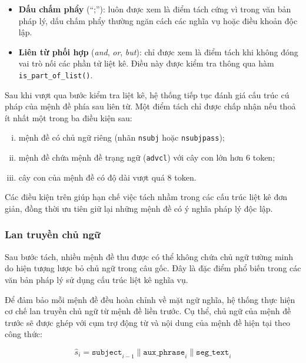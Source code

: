 \begin{itemize}
    \item \textbf{Dấu chấm phẩy} (``;''): luôn được xem là điểm tách cứng
    vì trong văn bản pháp lý, dấu chấm phẩy thường ngăn cách các nghĩa vụ
    hoặc điều khoản độc lập.

    \item \textbf{Liên từ phối hợp} (\textit{and}, \textit{or},
    \textit{but}): chỉ được xem là điểm tách khi không đóng vai trò nối
    các phần tử liệt kê. Điều này được kiểm tra thông qua hàm
    \texttt{is\_part\_of\_list()}.
\end{itemize}

Sau khi vượt qua bước kiểm tra liệt kê, hệ thống tiếp tục đánh giá cấu
trúc cú pháp của mệnh đề phía sau liên từ. Một điểm tách chỉ được chấp
nhận nếu thoả ít nhất một trong ba điều kiện sau:

\begin{enumerate}[(i)]
    \item mệnh đề có chủ ngữ riêng (nhãn \texttt{nsubj} hoặc
          \texttt{nsubjpass});

    \item mệnh đề chứa mệnh đề trạng ngữ (\texttt{advcl}) với
          cây con lớn hơn 6 token;

    \item cây con của mệnh đề có độ dài vượt quá 8 token.
\end{enumerate}

Các điều kiện trên giúp hạn chế việc tách nhầm trong các cấu trúc liệt kê
đơn giản, đồng thời ưu tiên giữ lại những mệnh đề có ý nghĩa pháp lý độc
lập.

\subsubsection{Lan truyền chủ ngữ}

Sau bước tách, nhiều mệnh đề thu được có thể không chứa chủ ngữ tường
minh do hiện tượng lược bỏ chủ ngữ trong câu gốc. Đây là đặc điểm phổ
biến trong các văn bản pháp lý sử dụng cấu trúc liệt kê nghĩa vụ.

Để đảm bảo mỗi mệnh đề đều hoàn chỉnh về mặt ngữ nghĩa, hệ thống thực hiện
cơ chế lan truyền chủ ngữ từ mệnh đề liền trước. Cụ thể, chủ ngữ của
mệnh đề trước sẽ được ghép với cụm trợ động từ và nội dung của mệnh đề
hiện tại theo công thức:

\begin{equation}
    \hat{s}_i = \texttt{subject}_{i-1}
                \mathbin{\|} \texttt{aux\_phrase}_{i}
                \mathbin{\|} \texttt{seg\_text}_{i}
    \label{eq:subj-prop}
\end{equation}

